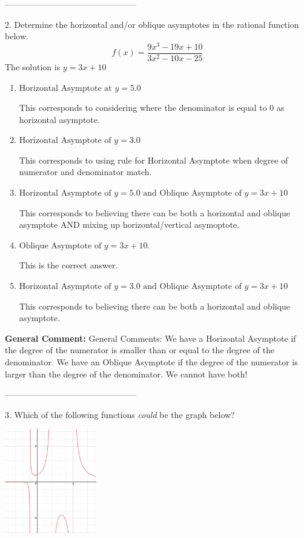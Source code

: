 \documentclass{extbook}[14pt]
\begin{document}
-----------------------------------------------

2. Determine the horizontal and/or oblique asymptotes in the rational function below.
\[ f(x) = \frac{9x^{3} -19 x + 10}{3x^{2} -10 x -25} \] 
The solution is $ y = 3x + 10 $ 

\begin{enumerate}[label=\Alph*.] 
\item $ \text{Horizontal Asymptote at } y = 5.0 $ 

 This corresponds to considering where the denominator is equal to 0 as horizontal asymptote. 
\item $ \text{Horizontal Asymptote of } y = 3.0  $ 

 This corresponds to using rule for Horizontal Asymptote when degree of numerator and denominator match. 
\item $ \text{Horizontal Asymptote of } y = 5.0 \text{ and Oblique Asymptote of } y = 3x + 10 $ 

 This corresponds to believing there can be both a horizontal and oblique asymptote AND mixing up horizontal/vertical asymoptote. 
\item $ \text{Oblique Asymptote of } y = 3x + 10. $ 

 This is the correct answer. 
\item $ \text{Horizontal Asymptote of } y = 3.0 \text{ and Oblique Asymptote of } y = 3x + 10 $ 

 This corresponds to believing there can be both a horizontal and oblique asymptote. 
\end{enumerate} 
 
\textbf{General Comment:} General Comments: We have a Horizontal Asymptote if the degree of the numerator is smaller than or equal to the degree of the denominator. We have an Oblique Asymptote if the degree of the numerator is larger than the degree of the denominator. We cannot have both! 

-----------------------------------------------

3. Which of the following functions \textit{could} be the graph below?
\begin{center} \includegraphics[width=0.3\textwidth]{../Figures/identifyGraphOfRationalFunctionA.png} \end{center} 
\end{document}
